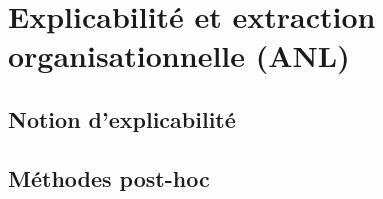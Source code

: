 



\section{Explicabilité et extraction organisationnelle (ANL)}

\subsection{Notion d'explicabilité}

\subsection{Méthodes post-hoc}

